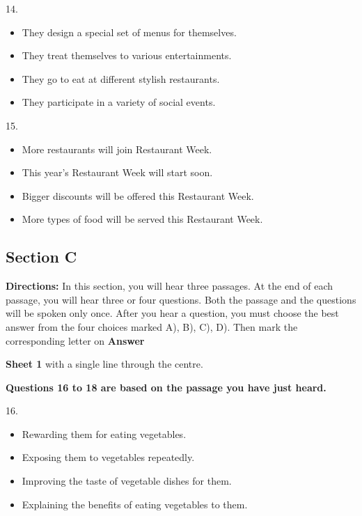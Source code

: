 \documentclass[UTF8,11pt]{ctexart}
\begin{document}
14.


\begin{itemize}[leftmargin=2em,itemsep=.2em,topsep=.4em]\item[A.] They design a special set of menus for themselves.
\item[B.] They treat themselves to various entertainments.
\item[C.] They go to eat at different stylish restaurants.
\item[D.] They participate in a variety of social events.
\end{itemize}

15.


\begin{itemize}[leftmargin=2em,itemsep=.2em,topsep=.4em]\item[A.] More restaurants will join Restaurant Week.
\item[B.] This year’s Restaurant Week will start soon.
\item[C.] Bigger discounts will be offered this Restaurant Week.
\item[D.] More types of food will be served this Restaurant Week.
\end{itemize}

\subsection*{\textbf{Section C}}


\textbf{Directions:} In this section, you will hear three passages. At the end of each passage, you will hear three or four questions. Both the passage and the questions will be spoken only once. After you hear a question, you must choose the best answer from the four choices marked A), B), C), D). Then mark the corresponding letter on\textbf{ Answer}


\textbf{Sheet 1} with a single line through the centre.


\textbf{Questions 16 to 18 are based on the passage you have just heard.}


16.


\begin{itemize}[leftmargin=2em,itemsep=.2em,topsep=.4em]\item[A.] Rewarding them for eating vegetables.
\item[B.] Exposing them to vegetables repeatedly.
\end{itemize}

\begin{itemize}[leftmargin=2em,itemsep=.2em,topsep=.4em]\item[C.] Improving the taste of vegetable dishes for them.
\item[D.] Explaining the benefits of eating vegetables to them.
\end{itemize}
\end{document}
